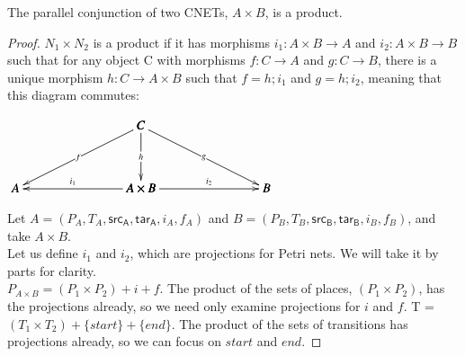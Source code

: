 \begin{lemma}
\label{lemma:PARA-AND-PRODUCT}
The parallel conjunction of two CNETs, $A \times B$, is a product.
\end{lemma}
\begin{proof}
$N_1 \times N_2$ is a product if it has morphisms $i_1: A \times B \to A$ and $i_2: A \times B \to B$ such that for any object C with morphisms $f: C\to A$ and $g: C\to B$, there is a unique morphism $h: C \to A \times B$ such that $f =h; i_1$ and $g = h;i_2$, meaning that this diagram commutes:\\
\begin{center}
  \begin{math}
    \bfig
    \Atrianglepair|mmmaa|/->`->`->`<-`->/<1000,500>[
      C`
      A`
      A\times B`
      B;
      f`
      h`
      g`
      i_1`
      i_2]
    \efig
  \end{math}
\end{center}
Let $A = (P_A, T_A, \mathsf{src_A}, \mathsf{tar_A}, i_A, f_A)$ and $B = (P_B, T_B, \mathsf{src_B}, \mathsf{tar_B}, i_B, f_B)$, and take $A \times B$.\\
Let us define $i_1$ and $i_2$, which are projections for Petri nets. We will take it by parts for clarity.\\
$P_{A \times B} = (P_1 \times P_2) + i + f$. The product of the sets of places, $(P_1 \times P_2)$, has the projections already, so we need only examine projections for $i$ and $f$.  
T = $(T_1 \times T_2) + \{start\} +\{end\}$. The product of the sets of transitions has projections already, so we can focus on $start$ and $end$. 
\end{proof} 
